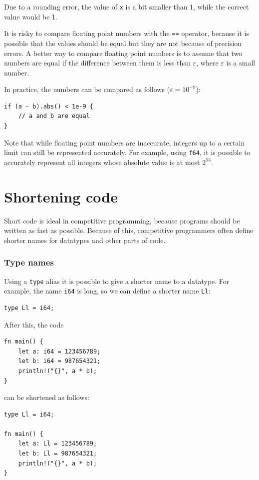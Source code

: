 Due to a rounding error,
the value of \texttt{x} is a bit smaller than 1,
while the correct value would be 1.

It is risky to compare floating point numbers
with the \texttt{==} operator,
because it is possible that the values should be
equal but they are not because of precision errors.
A better way to compare floating point numbers
is to assume that two numbers are equal
if the difference between them is less than $\varepsilon$,
where $\varepsilon$ is a small number.

In practice, the numbers can be compared
as follows ($\varepsilon=10^{-9}$):

\begin{lstlisting}
if (a - b).abs() < 1e-9 {
    // a and b are equal
}
\end{lstlisting}

Note that while floating point numbers are inaccurate,
integers up to a certain limit can still be
represented accurately.
For example, using \texttt{f64},
it is possible to accurately represent all
integers whose absolute value is at most $2^{53}$.

\section{Shortening code}

Short code is ideal in competitive programming,
because programs should be written
as fast as possible.
Because of this, competitive programmers often define
shorter names for datatypes and other parts of code.

\subsubsection{Type names}
Using a \texttt{type} alias
it is possible to give a shorter name
to a datatype.
For example, the name \texttt{i64} is long,
so we can define a shorter name \texttt{Ll}:
\begin{lstlisting}
type Ll = i64;
\end{lstlisting}
After this, the code
\begin{lstlisting}
fn main() {
    let a: i64 = 123456789;
    let b: i64 = 987654321;
    println!("{}", a * b);
}
\end{lstlisting}
can be shortened as follows:
\begin{lstlisting}
type Ll = i64;

fn main() {
    let a: Ll = 123456789;
    let b: Ll = 987654321;
    println!("{}", a * b);
}
\end{lstlisting}

